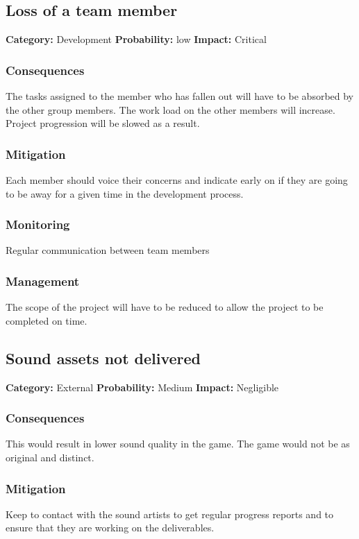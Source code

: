 \documentclass[a4paper,10pt]{article}
\begin{document}
\subsection{Loss of a team member}
\textbf{Category:} Development\newline
\textbf{Probability:} low\newline
\textbf{Impact:} Critical
\subsubsection*{Consequences}
The tasks assigned to the member who has fallen out will have to be absorbed by the other group members. The work load on the other members will increase. Project progression will be slowed as a result.
\subsubsection*{Mitigation}
Each member should voice their concerns and indicate early on if they are going to be away for a given time in the development process.
\subsubsection*{Monitoring}
Regular communication between team members
\subsubsection*{Management}
The scope of the project will have to be reduced to allow the project to be completed on time. 

\subsection{Sound assets not delivered}
\textbf{Category:} External\newline
\textbf{Probability:} Medium\newline
\textbf{Impact:} Negligible
\subsubsection*{Consequences}
This would result in lower sound quality in the game.
The game would not be as original and distinct.
\subsubsection*{Mitigation}
Keep to contact with the sound artists to get regular progress reports and to ensure that they are working on the deliverables.
\end{document}
